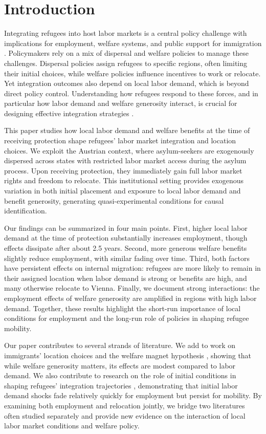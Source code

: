 \section{Introduction}

Integrating refugees into host labor markets is a central policy challenge with implications for employment, welfare systems, and public support for immigration \citep{brell_labor_2020}. Policymakers rely on a mix of dispersal and welfare policies to manage these challenges. Dispersal policies assign refugees to specific regions, often limiting their initial choices, while welfare policies influence incentives to work or relocate. Yet integration outcomes also depend on local labor demand, which is beyond direct policy control. Understanding how refugees respond to these forces, and in particular how labor demand and welfare generosity interact, is crucial for designing effective integration strategies \citep{adda2022}.

This paper studies how local labor demand and welfare benefits at the time of receiving protection shape refugees’ labor market integration and location choices. We exploit the Austrian context, where asylum-seekers are exogenously dispersed across states with restricted labor market access during the asylum process. Upon receiving protection, they immediately gain full labor market rights and freedom to relocate. This institutional setting provides exogenous variation in both initial placement and exposure to local labor demand and benefit generosity, generating quasi-experimental conditions for causal identification.

Our findings can be summarized in four main points. First, higher local labor demand at the time of protection substantially increases employment, though effects dissipate after about 2.5 years. Second, more generous welfare benefits slightly reduce employment, with similar fading over time. Third, both factors have persistent effects on internal migration: refugees are more likely to remain in their assigned location when labor demand is strong or benefits are high, and many otherwise relocate to Vienna. Finally, we document strong interactions: the employment effects of welfare generosity are amplified in regions with high labor demand. Together, these results highlight the short-run importance of local conditions for employment and the long-run role of policies in shaping refugee mobility.

Our paper contributes to several strands of literature. We add to work on immigrants’ location choices and the welfare magnet hypothesis \citep{borjas1999, ferwerda2023, monras2023}, showing that while welfare generosity matters, its effects are modest compared to labor demand. We also contribute to research on the role of initial conditions in shaping refugees’ integration trajectories \citep{aslund_when_2007, fasani_struggle_2022, dustmann2024}, demonstrating that initial labor demand shocks fade relatively quickly for employment but persist for mobility. By examining both employment and relocation jointly, we bridge two literatures often studied separately and provide new evidence on the interaction of local labor market conditions and welfare policy.

